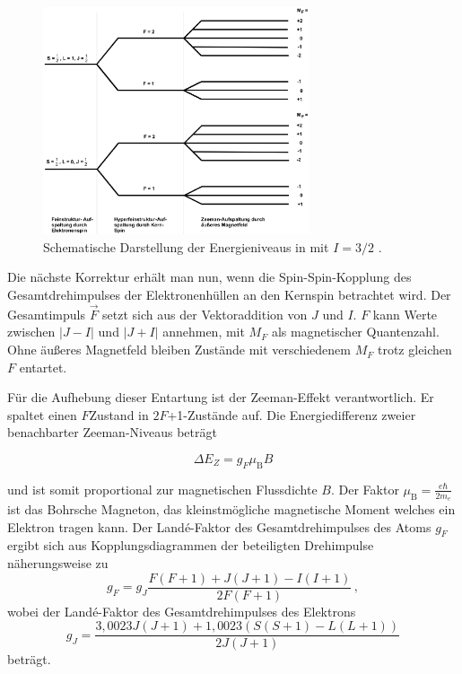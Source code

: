 \begin{figure}
    \centering
    \includegraphics[width=0.7\textwidth]{images/feinstruktur.png}
    \caption{Schematische Darstellung der Energieniveaus in  mit $I=3/2$ \cite{anleitungAlt}.}
    \label{fig:energyN}
\end{figure}

Die nächste Korrektur erhält man nun, wenn die Spin-Spin-Kopplung des Gesamtdrehimpulses
der Elektronenhüllen an den Kernspin betrachtet wird.
Der Gesamtimpuls $\vec{F}$ setzt sich aus der Vektoraddition von $J$ und $I$.
$F$ kann Werte zwischen $\lvert J - I \rvert$ und $\lvert J + I \rvert$ annehmen,
mit $M_F$ als magnetischer Quantenzahl.
Ohne äußeres Magnetfeld bleiben Zustände mit verschiedenem $M_F$ trotz gleichen $F$
entartet.

Für die Aufhebung dieser Entartung ist der Zeeman-Effekt verantwortlich.
Er spaltet einen $F$\;Zustand in $2F$+1-Zustände auf.
Die Energiedifferenz zweier benachbarter Zeeman-Niveaus beträgt

\begin{equation}
  \Delta E_Z = g_F \mu_{\text{B}} B
  \label{eqn:zeemanDifferenz}
\end{equation}

und ist somit proportional zur magnetischen Flussdichte $B$.
Der Faktor $\mu_{\text{B}} = \frac{e \hbar}{2m_e}$ ist das Bohrsche Magneton,
das kleinstmögliche magnetische Moment welches ein Elektron tragen kann.
Der Landé-Faktor des Gesamtdrehimpulses des Atoms $g_F$ ergibt sich aus
Kopplungsdiagrammen der beteiligten Drehimpulse näherungsweise zu
\begin{equation}
  g_F = g_J \frac{F(F+1)+J(J+1)-I(I+1)}{2F(F+1)}\,,
  \label{eqn:g_F_Theorie}
\end{equation}
wobei der Landé-Faktor des Gesamtdrehimpulses des Elektrons
\begin{equation}
  g_J = \frac{3{,}0023J(J+1)+1{,}0023(S(S+1)-L(L+1))}{2J(J+1)}
  \label{eqn:g_J_Theorie}
\end{equation}
beträgt.


